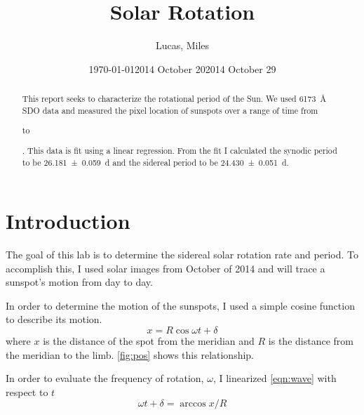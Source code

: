 \documentclass[%
aip,
jmp,
reprint,
floatfix,
]{revtex4-1}
\begin{document}
	\title[Solar Rotation]{Solar Rotation}

	\author{Lucas, Miles}

	\date{\today}



	\begin{abstract}
	This report seeks to characterize the rotational period of the Sun. We used \SI{6173}{\angstrom} SDO data and measured the pixel location of sunspots over a range of time from \date{2014 October 20} to \date{2014 October 29}. This data is fit using a linear regression. From the fit I calculated the synodic period to be \SI{26.181 \pm .059}{\day} and the sidereal period to be \SI{24.430 \pm .051}{\day}.
	\end{abstract}

	\maketitle


	\section{Introduction}
	The goal of this lab is to determine the sidereal solar rotation rate and period. To accomplish this, I used solar images from October of 2014 and will trace a sunspot's motion from day to day. 
	
	In order to determine the motion of the sunspots, I used a simple cosine function to describe its motion.
	\begin{equation}
	x = R \cos{\omega t + \delta}
	\label{eqn:wave}
	\end{equation}
	where $x$ is the distance of the spot from the meridian and $R$ is the distance from the meridian to the limb. \autoref{fig:pos} shows this relationship.
	
	In order to evaluate the frequency of rotation, $\omega$, I linearized \autoref{eqn:wave} with respect to $t$
	\begin{equation}
	\omega t + \delta = \arccos{x/R}
	\label{eqn:line}
	\end{equation}
	
\end{document}
